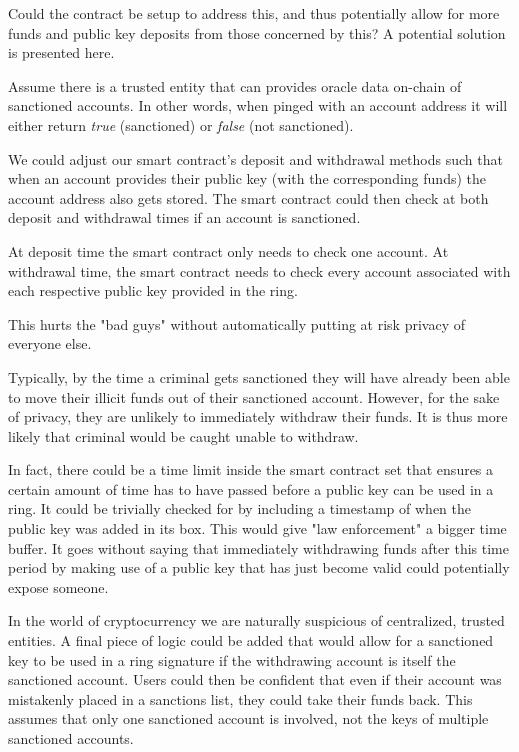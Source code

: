 \documentclass[9pt]{article}
\begin{document}
Could the contract be setup to address this, and thus potentially allow for more funds and public key deposits from those concerned by this? A potential solution is presented here.

Assume there is a trusted entity that can provides oracle data on-chain of sanctioned accounts. In other words, when pinged with an account address it will either return \textit{true} (sanctioned) or \textit{false} (not sanctioned).

We could adjust our smart contract's deposit and withdrawal methods such that when an account provides their public key (with the corresponding funds) the account address also gets stored. The smart contract could then check at both deposit and withdrawal times if an account is sanctioned. 

At deposit time the smart contract only needs to check one account. At withdrawal time, the smart contract needs to check every account associated with each respective public key provided in the ring.

This hurts the "bad guys" without automatically putting at risk privacy of everyone else.

Typically, by the time a criminal gets sanctioned they will have already been able to move their illicit funds out of their sanctioned account. However, for the sake of privacy, they are unlikely to immediately withdraw their funds. It is thus more likely that criminal would be caught unable to withdraw.

In fact, there could be a time limit inside the smart contract set that ensures a certain amount of time has to have passed before a public key can be used in a ring. It could be trivially checked for by including a timestamp of when the public key was added in its box. This would give "law enforcement" a bigger time buffer. It goes without saying that immediately withdrawing funds after this time period by making use of a public key that has just become valid could potentially expose someone.

In the world of cryptocurrency we are naturally suspicious of centralized, trusted entities. A final piece of logic could be added that would allow for a sanctioned key to be used in a ring signature if the withdrawing account is itself the sanctioned account. Users could then be confident that even if their account was mistakenly placed in a sanctions list, they could take their funds back. This assumes that only one sanctioned account is involved, not the keys of multiple sanctioned accounts.
\end{document}
